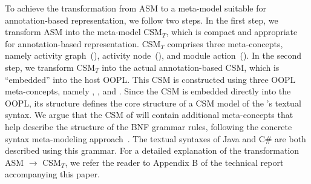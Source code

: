To achieve the transformation from ASM to a meta-model suitable for annotation-based representation, we follow two steps. In the first step, we transform ASM into the meta-model CSM$_T$, which is compact and appropriate for annotation-based representation. CSM$_T$ comprises three meta-concepts, namely activity graph~(), activity node~(), and module action~(). In the second step, we transform CSM$_T$ into the actual annotation-based CSM, which is ``embedded'' into the host OOPL. This CSM is constructed using three OOPL meta-concepts, namely , , and . Since the CSM is embedded directly into the OOPL, its structure defines the core structure of a CSM model of the \agl's textual syntax. We argue that the CSM of \agl will contain additional meta-concepts that help describe the structure of the BNF grammar rules, following the concrete syntax meta-modeling approach~\cite{kleppe_software_2008}. The textual syntaxes of Java and C\# are both described using this grammar. For a detailed explanation of the transformation ASM $\rightarrow$ CSM$_T$, we refer the reader to Appendix B of the technical report~\cite{dang2023aglTechReport} accompanying this paper.

